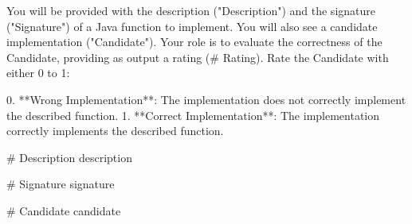 You will be provided with the description ("Description") and the signature ("Signature") of a Java function to implement. You will also see a candidate implementation ("Candidate"). Your role is to evaluate the correctness of the Candidate, providing as output a rating (# Rating). Rate the Candidate with either 0 to 1:

0. **Wrong Implementation**: The implementation does not correctly implement the described function.
1. **Correct Implementation**: The implementation correctly implements the described function.

# Description
{description}

# Signature
{signature}

# Candidate
{candidate}